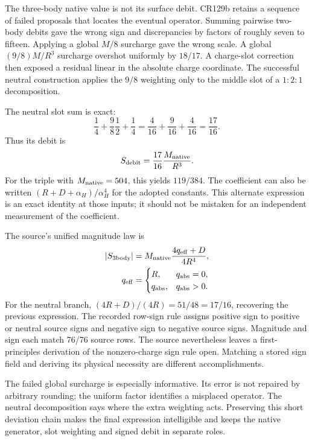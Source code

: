 The three-body native value is not its surface debit. CR129b retains a sequence of failed proposals that locates the eventual operator. Summing pairwise two-body debits gave the wrong sign and discrepancies by factors of roughly seven to fifteen. Applying a global $M/8$ surcharge gave the wrong scale. A global $(9/8)M/R^3$ surcharge overshot uniformly by $18/17$. A charge-slot correction then exposed a residual linear in the absolute charge coordinate. The successful neutral construction applies the $9/8$ weighting only to the middle slot of a $1{:}2{:}1$ decomposition.

The neutral slot sum is exact:
\begin{equation}
\frac14+\frac98\frac12+\frac14
=\frac4{16}+\frac9{16}+\frac4{16}
=\frac{17}{16}.
\end{equation}
Thus its debit is
\begin{equation}
S_{\rm debit}=\frac{17}{16}\frac{M_{\rm native}}{R^3}.
\end{equation}
For the triple with $M_{\rm native}=504$, this yields $119/384$. The coefficient can also be written $(R+D+\alpha_H)/\alpha_H^4$ for the adopted constants. This alternate expression is an exact identity at those inputs; it should not be mistaken for an independent measurement of the coefficient.

The source's unified magnitude law is
\begin{equation}
\begin{aligned}
|S_{3\rm body}|&=M_{\rm native}\frac{4q_{\rm eff}+D}{4R^4},\\
q_{\rm eff}&=\begin{cases}R,&q_{\rm abs}=0,\\q_{\rm abs},&q_{\rm abs}>0.\end{cases}
\end{aligned}
\label{v2c2:debit}
\end{equation}
For the neutral branch, $(4R+D)/(4R)=51/48=17/16$, recovering the previous expression. The recorded row-sign rule assigns positive sign to positive or neutral source signs and negative sign to negative source signs. Magnitude and sign each match 76/76 source rows. The source nevertheless leaves a first-principles derivation of the nonzero-charge sign rule open. Matching a stored sign field and deriving its physical necessity are different accomplishments.

The failed global surcharge is especially informative. Its error is not repaired by arbitrary rounding; the uniform factor identifies a misplaced operator. The neutral decomposition says where the extra weighting acts. Preserving this short deviation chain makes the final expression intelligible and keeps the native generator, slot weighting and signed debit in separate roles.

